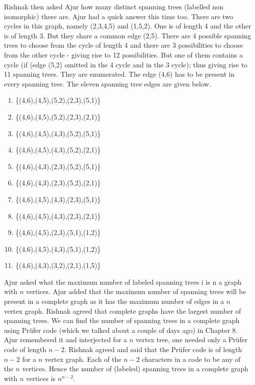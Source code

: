 Rishnak then asked Ajur how many distinct spanning trees (labelled non isomorphic) there are. Ajur had a quick answer this time too. There are two cycles in this graph, namely (2,3,4,5) and (1,5,2). One is of 
length 4 and the other is of length 3. But they share a common edge (2,5). There are 4 possible spanning trees to choose from the cycle of length 4 and there are 3 possibilities to choose from the other cycle - giving rise to 12 possibilities. But one of them contains a cycle (if (edge (5,2) omitted in the 4 cycle and in the 3 cycle); thus giving rise to 11  spanning trees. They are enumerated.   
The edge (4,6) has to be present in every spanning tree. The eleven spanning tree edges are given below.
\begin{enumerate}
    \item \{(4,6),(4,5),(5,2),(2,3),(5,1)\}
    \item \{(4,6),(4,5),(5,2),(2,3),(2,1)\}
    \item \{(4,6),(4,5),(4,3),(5,2),(5,1)\}
    \item \{(4,6),(4,5),(4,3),(5,2),(2,1)\}
    \item \{(4,6),(4,3),(2,3),(5,2),(5,1)\}
    \item \{(4,6),(4,3),(2,3),(5,2),(2,1)\}
    \item \{(4,6),(4,5),(4,3),(2,3),(5,1)\}
    \item \{(4,6),(4,5),(4,3),(2,3),(2,1)\}
    \item \{(4,6),(4,5),(2,3),(5,1),(1,2)\}
    \item \{(4,6),(4,5),(4,3),(5,1),(1,2)\}
    \item \{(4,6),(4,3),(3,2),(2,1),(1,5)\}
\end{enumerate}

Ajur asked what the maximum number of labeled spanning trees i is n a graph with $n$ vertices. Ajur added that the maximum number of spanning trees will be present in a complete graph as it has the maximum number of edges in a $n$ vertex graph. Rishnak agreed that complete graphs have the largest number of spanning trees. We can find the number of spanning trees in a complete graph using Pr{\"u}fer code (which we talked about a couple of days ago) in Chapter 8. Ajur remembered it and interjected for a $n$ vertex tree, one needed only a Pr{\"u}fer code of length $n-2$. Rishnak agreed and said that the Pr{\"u}fer code is of length $n-2$ for a $n$ vertex graph. Each of the $n-2$ characters in a code to be any of the $n$ vertices. Hence the number of (labeled) spanning trees in a complete graph with $n$ vertices is $n^{n-2}$.

